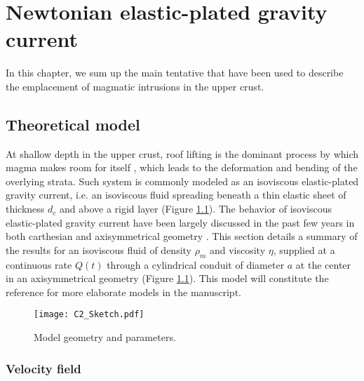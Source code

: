 \chapter{Newtonian elastic-plated gravity current} 
\label{chap2} 
\minitoc

In this chapter, we  sum up the main tentative that  have been used to
describe the emplacement of magmatic intrusions in the upper crust.

\section{Theoretical model}
\label{sec:model-1}

At shallow  depth in  the upper  crust, roof  lifting is  the dominant
process     by    which     magma     makes     room    for     itself
\citep{Johnson:1973ho,Pollard:1973ho}, which leads  to the deformation
and bending of the overlying  strata.  Such system is commonly modeled
as an  isoviscous elastic-plated gravity current,  i.e.  an isoviscous
fluid spreading  beneath a thin  elastic sheet of thickness  $d_c$ and
above  a  rigid   layer  \citep{Michaut:2011kg,Bunger:2011cb}  (Figure
\ref{C2-Sketch}).  The  behavior of isoviscous  elastic-plated gravity
current have  been largely  discussed in  the past  few years  in both
carthesian \citep{Michaut:2011kg,Bunger:2011cb,Anonymous:QWXp_4JV} and
axisymmetrical  geometry  \citep{Michaut:2013dr,Lister:2013ia}.   This
section details  a summary of the  results for an isoviscous  fluid of
density $\rho_m$ and  viscosity $\eta$, supplied at  a continuous rate
$Q(t)$ through a cylindrical conduit of  diameter $a$ at the center in
an axisymmetrical  geometry (Figure \ref{C2-Sketch}). This  model will
constitute the reference for more elaborate models in the manuscript.

\begin{figure}[htbp]
  \begin{center}
    \graphicspath{ {/Users/thorey/Documents/These/Manuscript/Figure/Chapter2/} }
    \texttt{[image: C2\_Sketch.pdf]}
    \caption{Model geometry and parameters.}
    \label{C2-Sketch}
  \end{center}
\end{figure}

\subsection{Velocity field}
\label{sec:Velocity field}

